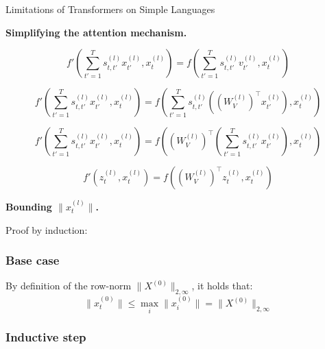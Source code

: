 \begin{question}{Limitations of Transformers on Simple Languages}

\begin{subquestion}{\textbf{Simplifying the attention mechanism.}}

    \begin{equation}
    f' \left( \sum_{t'=1}^{T} s_{t,t'}^{(l)} x_{t'}^{(l)}, x_{t}^{(l)} \right) = f \left( \sum_{t'=1}^{T} s_{t,t'}^{(l)} v_{t'}^{(l)}, x_{t}^{(l)} \right)
    \end{equation}

    \begin{equation}
    f' \left( \sum_{t'=1}^{T} s_{t,t'}^{(l)} x_{t'}^{(l)}, x_{t}^{(l)} \right) = f \left( \sum_{t'=1}^{T} s_{t,t'}^{(l)} ( (W_V^{(l)})^\top x_{t'}^{(l)} ), x_{t}^{(l)} \right)
    \end{equation}

    \begin{equation}
    f' \left( \sum_{t'=1}^{T} s_{t,t'}^{(l)} x_{t'}^{(l)}, x_{t}^{(l)} \right) = f \left( (W_V^{(l)})^\top \left( \sum_{t'=1}^{T} s_{t,t'}^{(l)} x_{t'}^{(l)} \right), x_{t}^{(l)} \right)
    \end{equation}

    \begin{equation}
    f'(z_t^{(l)}, x_t^{(l)}) = f((W_V^{(l)})^\top z_t^{(l)}, x_t^{(l)})
    \end{equation}

\end{subquestion}

\begin{subquestion}{\textbf{Bounding $\|x_{t}^{(l)}\|$.}}

    Proof by induction:

    \subsubsection*{\textbf{Base case}}

    By definition of the row-norm $\|X^{(0)}\|_{2,\infty}$, it holds that:
    \begin{equation}
    \|x_t^{(0)}\| \le \max_{i} \|x_i^{(0)}\| = \|X^{(0)}\|_{2,\infty}
    \end{equation}

    \subsubsection*{\textbf{Inductive step}}


\end{subquestion}
\end{question}
